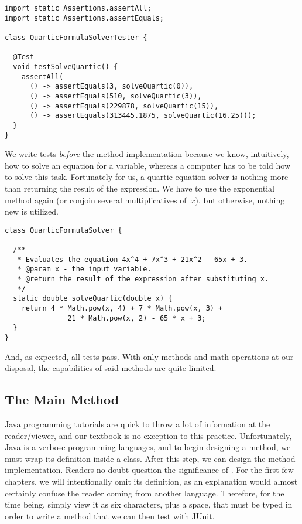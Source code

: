 \begin{lstlisting}[language=MyJava]
import static Assertions.assertAll;
import static Assertions.assertEquals;

class QuarticFormulaSolverTester {

  @Test
  void testSolveQuartic() {
    assertAll(
      () -> assertEquals(3, solveQuartic(0)),
      () -> assertEquals(510, solveQuartic(3)),
      () -> assertEquals(229878, solveQuartic(15)),
      () -> assertEquals(313445.1875, solveQuartic(16.25)));
  }
}
\end{lstlisting}

We write tests \emph{before} the method implementation because we know, intuitively, how to solve an equation for a variable, whereas a computer has to be told how to solve this task. 
Fortunately for us, a quartic equation solver is nothing more than returning the result of the expression. 
We have to use the exponential  method again (or conjoin several multiplicatives of~$x$), but otherwise, nothing new is utilized.

\enlargethispage{\baselineskip}
\begin{lstlisting}[language=MyJava]
class QuarticFormulaSolver {

  /**
   * Evaluates the equation 4x^4 + 7x^3 + 21x^2 - 65x + 3.
   * @param x - the input variable.
   * @return the result of the expression after substituting x.
   */
  static double solveQuartic(double x) {
    return 4 * Math.pow(x, 4) + 7 * Math.pow(x, 3) + 
               21 * Math.pow(x, 2) - 65 * x + 3;
  }
}
\end{lstlisting}

And, as expected, all tests pass. 
With only methods and math operations at our disposal, the capabilities of said methods are quite limited. 

\subsection{The Main Method}
Java programming tutorials are quick to throw a lot of information at the reader/viewer, and our textbook is no exception to this practice. 
Unfortunately, Java is a verbose programming languages, and to begin designing a method, we must wrap its definition inside a class. 
After this step, we can design the  method implementation. 
Readers no doubt question the significance of . 
For the first few chapters, we will intentionally omit its definition, as an explanation would almost certainly confuse the reader coming from another language. 
Therefore, for the time being, simply view it as six characters, plus a space, that must be typed in order to write a method that we can then test with JUnit. 

